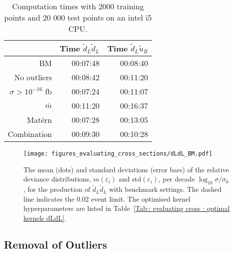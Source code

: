 \documentclass[twoside,english]{uiofysmaster}
\begin{document}
{{ 
 
\begin{table}
\centering
\begin{tabular}{@{}rrr@{}} \toprule
& Time $\widetilde{d}_L \widetilde{d}_L$ & Time $\widetilde{d}_L \widetilde{u}_R$\\
\midrule
BM & 00:07:48 & 00:08:40\\
No outliers & 00:08:42 & 00:11:20\\
$\sigma > 10^{-16}$ fb & 00:07:24 & 00:11:07\\
$\bar{m}$ & 00:11:20 & 00:16:37\\
Mat\'{e}rn & 00:07:28 & 00:13:05\\ 
Combination & 00:09:30 & 00:10:28\\
\bottomrule
\end{tabular}
\caption{Computation times with 2000 training points and 20 000 test points on an intel i5 CPU.}
\label{Tab:: evaluating cross : computation times BM}
\end{table}


\begin{figure}
\centering
\texttt{[image: figures\_evaluating\_cross\_sections/dLdL\_BM.pdf]}
\caption{The mean (dots) and standard deviations (error bars) of the relative deviance distributions, $m(\varepsilon_i)$ and $\mathrm{std}(\varepsilon_i)$, per decade $\log_{10} \sigma / \sigma_0$, for the production of $\widetilde{d}_L \widetilde{d}_L$ with benchmark settings. The dashed line indicates the 0.02 event limit.  The optimised kernel hyperparameters are listed in Table~\ref{Tab:: evaluating cross : optimal kernels dLdL}.}
\label{Fig:: evaluating cross : BM dLdL error plot}
\end{figure}


\subsection{Removal of Outliers}\label{Sec:: evaluating cross : Outliers}


}}
\end{document}
